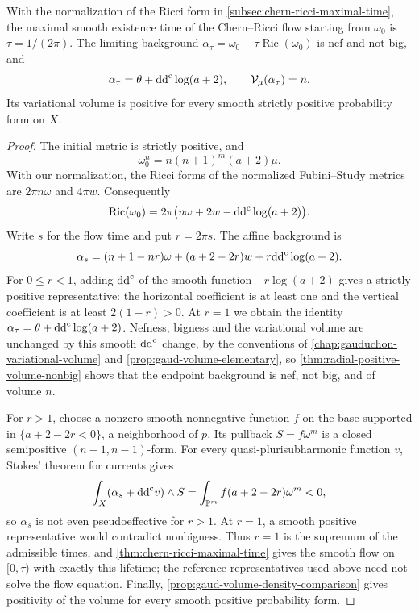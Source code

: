 \begin{theorem}\label{thm:actual-flow-positive-volume-nonbig}
With the normalization of the Ricci form in \cref{subsec:chern-ricci-maximal-time}, the maximal smooth existence time of the Chern--Ricci flow starting from $\omega_0$ is $\tau=1/(2\pi)$. The limiting background $\alpha_\tau=\omega_0-\tau\operatorname{Ric}(\omega_0)$ is nef and not big, and
\[
 \alpha_\tau=\theta+\mathrm{dd}^{\mathrm{c}}\log(a+2),\qquad
 \mathcal V_\mu(\alpha_\tau)=n.
\]
Its variational volume is positive for every smooth strictly positive probability form on $X$.
\end{theorem}
\begin{proof}
The initial metric is strictly positive, and
\[
 \omega_0^n=n(n+1)^m(a+2)\mu.
\]
With our normalization, the Ricci forms of the normalized Fubini--Study metrics are $2\pi n\omega$ and $4\pi w$. Consequently
\[
 \operatorname{Ric}(\omega_0)
   =2\pi\bigl(n\omega+2w-\mathrm{dd}^{\mathrm{c}}\log(a+2)\bigr).
\]
Write $s$ for the flow time and put $r=2\pi s$. The affine background is
\begin{equation}\label{eq:radial-flow-affine-background}
 \alpha_s=(n+1-nr)\omega+(a+2-2r)w
                          +r\mathrm{dd}^{\mathrm{c}}\log(a+2).
\end{equation}
For $0\leq r<1$, adding $\mathrm{dd}^{\mathrm{c}}$ of the smooth function $-r\log(a+2)$ gives a strictly positive representative: the horizontal coefficient is at least one and the vertical coefficient is at least $2(1-r)>0$. At $r=1$ we obtain the identity $\alpha_\tau=\theta+\mathrm{dd}^{\mathrm{c}}\log(a+2)$. Nefness, bigness and the variational volume are unchanged by this smooth $\mathrm{dd}^{\mathrm{c}}$ change, by the conventions of \cref{chap:gauduchon-variational-volume} and \cref{prop:gaud-volume-elementary}, so \cref{thm:radial-positive-volume-nonbig} shows that the endpoint background is nef, not big, and of volume $n$.

For $r>1$, choose a nonzero smooth nonnegative function $f$ on the base supported in $\{a+2-2r<0\}$, a neighborhood of $p$. Its pullback $S=f\omega^m$ is a closed semipositive $(n-1,n-1)$-form. For every quasi-plurisubharmonic function $v$, Stokes' theorem for currents gives
\[
 \int_X(\alpha_s+\mathrm{dd}^{\mathrm{c}} v)\wedge S
       =\int_{\mathbb P^m}f(a+2-2r)\omega^m<0,
\]
so $\alpha_s$ is not even pseudoeffective for $r>1$. At $r=1$, a smooth positive representative would contradict nonbigness. Thus $r=1$ is the supremum of the admissible times, and \cref{thm:chern-ricci-maximal-time} gives the smooth flow on $[0,\tau)$ with exactly this lifetime; the reference representatives used above need not solve the flow equation. Finally, \cref{prop:gaud-volume-density-comparison} gives positivity of the volume for every smooth positive probability form.
\end{proof}


